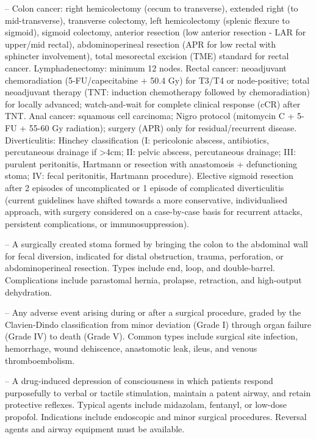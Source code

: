 -- Colon cancer: right hemicolectomy (cecum to transverse), extended right (to mid-transverse), transverse colectomy, left hemicolectomy (splenic flexure to sigmoid), sigmoid colectomy, anterior resection (low anterior resection - LAR for upper/mid rectal), abdominoperineal resection (APR for low rectal with sphincter involvement), total mesorectal excision (TME) standard for rectal cancer. Lymphadenectomy: minimum 12 nodes. Rectal cancer: neoadjuvant chemoradiation (5-FU/capecitabine + 50.4 Gy) for T3/T4 or node-positive; total neoadjuvant therapy (TNT: induction chemotherapy followed by chemoradiation) for locally advanced; watch-and-wait for complete clinical response (cCR) after TNT. Anal cancer: squamous cell carcinoma; Nigro protocol (mitomycin C + 5-FU + 55-60 Gy radiation); surgery (APR) only for residual/recurrent disease. Diverticulitis: Hinchey classification (I: pericolonic abscess, antibiotics, percutaneous drainage if >4cm; II: pelvic abscess, percutaneous drainage; III: purulent peritonitis, Hartmann or resection with anastomosis + defunctioning stoma; IV: fecal peritonitis, Hartmann procedure). Elective sigmoid resection after 2 episodes of uncomplicated or 1 episode of complicated diverticulitis (current guidelines have shifted towards a more conservative, individualised approach, with surgery considered on a case-by-case basis for recurrent attacks, persistent complications, or immunosuppression).

-- A surgically created stoma formed by bringing the colon to the abdominal wall for fecal diversion, indicated for distal obstruction, trauma, perforation, or abdominoperineal resection. Types include end, loop, and double-barrel. Complications include parastomal hernia, prolapse, retraction, and high-output dehydration.

-- Any adverse event arising during or after a surgical procedure, graded by the Clavien-Dindo classification from minor deviation (Grade I) through organ failure (Grade IV) to death (Grade V). Common types include surgical site infection, hemorrhage, wound dehiscence, anastomotic leak, ileus, and venous thromboembolism.

-- A drug-induced depression of consciousness in which patients respond purposefully to verbal or tactile stimulation, maintain a patent airway, and retain protective reflexes. Typical agents include midazolam, fentanyl, or low-dose propofol. Indications include endoscopic and minor surgical procedures. Reversal agents and airway equipment must be available.

